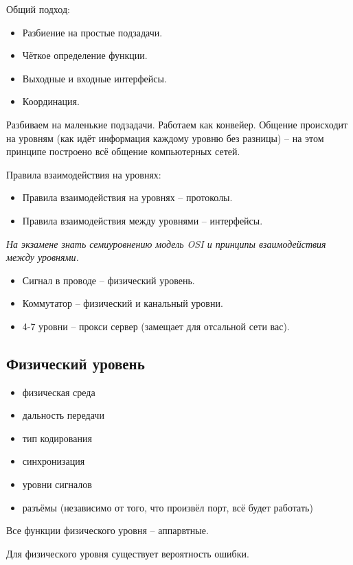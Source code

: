 Общий подход:
\begin{itemize}
    \item Разбиение на простые подзадачи.
    \item Чёткое определение функции.
    \item Выходные и входные интерфейсы.
    \item Координация.
\end{itemize}

Разбиваем на маленькие подзадачи. Работаем как конвейер. Общение происходит на уровням (как идёт информация каждому уровню без разницы) – на этом принципе построено всё общение компьютерных сетей.

Правила взаимодействия на уровнях:
\begin{itemize}
   \item Правила взаимодействия на уровнях – протоколы.
   \item Правила взаимодействия между уровнями – интерфейсы.
\end{itemize}

\textit{На экзамене знать семиуровнению модель OSI и принципы взаимодействия между уровнями.}

\begin{itemize}
    \item Сигнал в проводе – физический уровень.
    \item Коммутатор – физический и канальный уровни.
    \item 4-7 уровни – прокси сервер (замещает для отсальной сети вас).
\end{itemize}

\subsection{Физический уровень}

\begin{itemize}
    \item физическая среда
    \item дальность передачи
    \item тип кодирования
    \item синхронизация
    \item уровни сигналов
    \item разъёмы (независимо от того, что произвёл порт, всё будет работать)
\end{itemize}

Все функции физического уровня – аппарвтные.

Для физического уровня существует вероятность ошибки.

